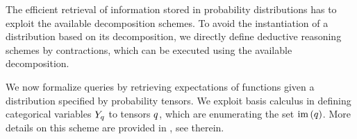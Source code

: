 
The efficient retrieval of information stored in probability distributions has to exploit the available decomposition schemes.
To avoid the instantiation of a distribution based on its decomposition, we directly define deductive reasoning schemes by contractions, which can be executed using the available decomposition.


We now formalize queries by retrieving expectations of functions given a distribution specified by probability tensors.
We exploit basis calculus in defining categorical variables $Y_{q}$ to tensors $q$, which are enumerating the set $\mathrm{im}\left(q\right)$.
More details on this scheme are provided in , see  therein.

